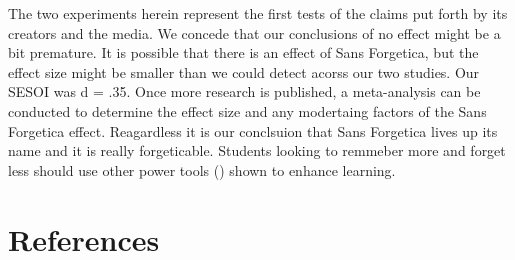 \documentclass[doc]{apa6}
\begin{document}
The two experiments herein represent the first tests of the claims put forth by its creators and the media. We concede that our conclusions of no effect might be a bit premature. It is possible that there is an effect of Sans Forgetica, but the effect size might be smaller than we could detect acorss our two studies. Our SESOI was d = .35. Once more research is published, a meta-analysis can be conducted to determine the effect size and any modertaing factors of the Sans Forgetica effect. Reagardless it is our conclsuion that Sans Forgetica lives up its name and it is really forgeticable. Students looking to remmeber more and forget less should use other power tools () shown to enhance learning.

\newpage

\hypertarget{references}{%
\section{References}\label{references}}

\begingroup
\setlength{\parindent}{-0.5in}
\setlength{\leftskip}{0.5in}

\hypertarget{refs}{}

\endgroup
\end{document}
